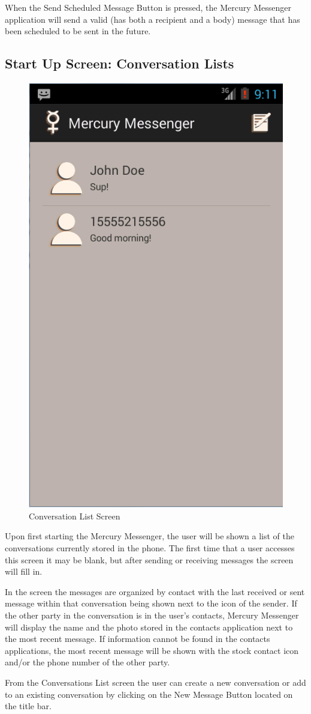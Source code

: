 \documentclass{article}
\begin{document}
\par When the Send Scheduled Message Button is pressed, the Mercury Messenger application will send a valid (has both a recipient and a body) message that has been scheduled to be sent in the future.


\subsection{Start Up Screen: Conversation Lists}
\label{sec:ConvoList}
\begin{figure}[h!]
\centering
\includegraphics[width=.25\textwidth]{"./Screen_shots/Main_Screen"}{}
\caption{Conversation List Screen}

\end{figure}



\par Upon first starting the Mercury Messenger, the user will be shown a list of the conversations currently stored in the phone. The first time that a user accesses this screen it may be blank, but after sending or receiving messages the screen will fill in.

\par In the screen the messages are organized by contact with the last received or sent message within that conversation being shown next to the icon of the sender. If the other party in the conversation is in the user's contacts, Mercury Messenger will display the name and the photo stored in the contacts application next to the most recent message.
If information cannot be found in the contacts applications, the most recent message will be shown with the stock contact icon and/or the phone number of the other party.

\par From the Conversations List screen the user can create a new conversation or add to an existing conversation by clicking on the New Message Button located on the title bar. 
\end{document}
